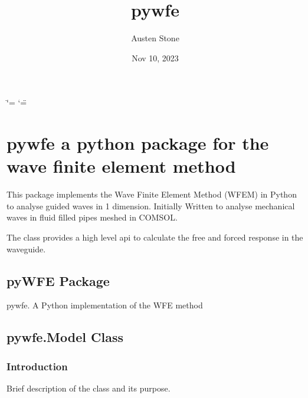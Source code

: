 \documentclass[letterpaper,10pt,english]{sphinxmanual}
\title{pywfe}
\date{Nov 10, 2023}
\author{Austen Stone}
\let\sphinxpxdimen\pdfpxdimen\else\newdimen\sphinxpxdimen
\begin{document}
\ifdefined\shorthandoff
  \ifnum\catcode`\=\string=\active\shorthandoff{=}\fi
  \ifnum\catcode`\"=\active{}\fi
\fi

\pagestyle{empty}
\sphinxmaketitle
\pagestyle{plain}
\sphinxtableofcontents
\pagestyle{normal}
\label{\detokenize{index::doc}}



\chapter{pywfe \sphinxhyphen{} a python package for the wave finite element method}
\label{\detokenize{index:pywfe-a-python-package-for-the-wave-finite-element-method}}
\noindent{\hspace*{\fill}\sphinxincludegraphics[width=1000\sphinxpxdimen]{{logo}.png}\hspace*{\fill}}

\sphinxAtStartPar
This package implements the Wave Finite Element Method (WFEM) in Python to analyse guided waves in 1 dimension. Initially Written to analyse mechanical waves in fluid filled pipes meshed in COMSOL.

\sphinxAtStartPar
{}

\sphinxAtStartPar
The  class provides a high level api to calculate the free and forced response in the waveguide.

\sphinxstepscope


\section{pyWFE Package}
\label{\detokenize{pywfe:module-pywfe}}\label{\detokenize{pywfe:pywfe-package}}\label{\detokenize{pywfe::doc}}
\sphinxAtStartPar
pywfe. A Python implementation of the WFE method

\sphinxstepscope


\section{pywfe.Model Class}
\label{\detokenize{model:pywfe-model-class}}\label{\detokenize{model::doc}}

\subsection{Introduction}
\label{\detokenize{model:introduction}}
\sphinxAtStartPar
Brief description of the class and its purpose.
\end{document}
